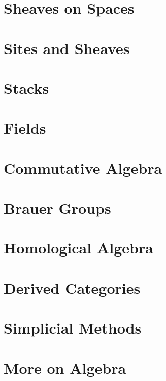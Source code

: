 \chapter{Sheaves on Spaces}
\label{chap:sheaves}


\chapter{Sites and Sheaves}
\label{chap:sites}


\chapter{Stacks}
\label{chap:stacks}


\chapter{Fields}
\label{chap:fields}


\chapter{Commutative Algebra}
\label{chap:algebra}


\chapter{Brauer Groups}
\label{chap:brauer}


\chapter{Homological Algebra}
\label{chap:homology}


\chapter{Derived Categories}
\label{chap:derived}


\chapter{Simplicial Methods}
\label{chap:simplicial}


\chapter{More on Algebra}
\label{chap:more-algebra}


